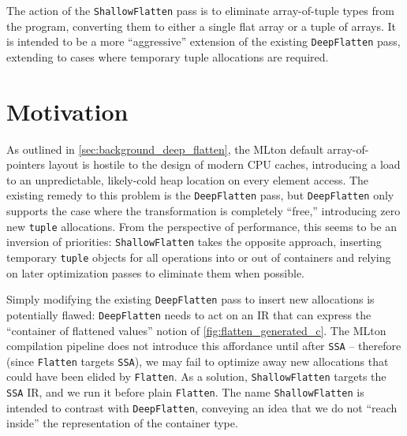 The action of the \texttt{ShallowFlatten} pass is to eliminate array-of-tuple
types from the program, converting them to either a single flat array or a tuple
of arrays. It is intended to be a more ``aggressive'' extension of the existing
\texttt{DeepFlatten} pass, extending to cases where temporary tuple allocations
are required.


\section{Motivation}
As outlined in \cref{sec:background_deep_flatten}, the MLton default
array-of-pointers layout is hostile to the design of modern CPU caches,
introducing a load to an unpredictable, likely-cold heap location on every
element access. The existing remedy to this problem is the \texttt{DeepFlatten}
pass, but \texttt{DeepFlatten} only supports the case where the transformation
is completely ``free,'' introducing zero new \texttt{tuple} allocations. From
the perspective of performance, this seems to be an inversion of
priorities: \texttt{ShallowFlatten} takes the opposite approach, inserting
temporary \texttt{tuple} objects for all operations into or out of containers
and relying on later optimization passes to eliminate them when possible.


Simply modifying the existing \texttt{DeepFlatten} pass to insert new
allocations is potentially flawed: \texttt{DeepFlatten} needs to act on an IR
that can express the ``container of flattened values'' notion
of \cref{fig:flatten_generated_c}. The MLton compilation pipeline does not
introduce this affordance until after \texttt{SSA} -- therefore
(since \texttt{Flatten} targets \texttt{SSA}), we may fail to optimize away new
allocations that could have been elided by \texttt{Flatten}. As a solution,
\texttt{ShallowFlatten} targets the \texttt{SSA} IR, and we run it before
plain \texttt{Flatten}. The name \texttt{ShallowFlatten} is intended to contrast
with \texttt{DeepFlatten}, conveying an idea that we do not ``reach inside'' the
representation of the container type.




